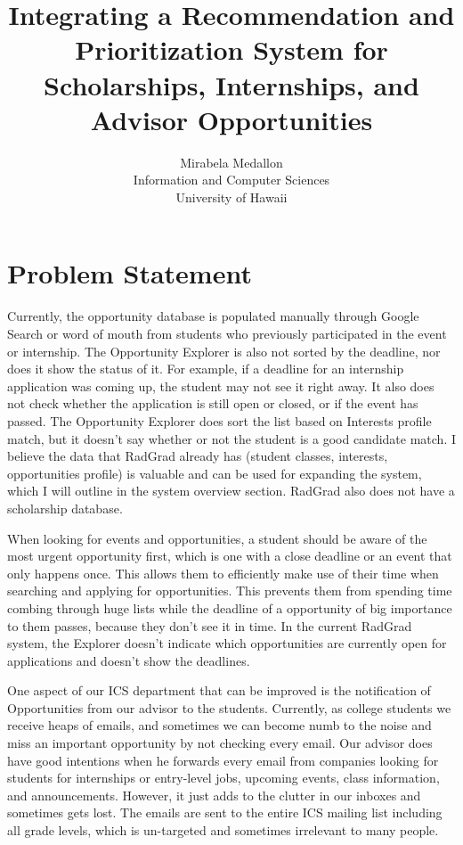 \documentclass[english]{proposalnsf}
\title{Integrating a Recommendation and Prioritization System for Scholarships, Internships, and Advisor Opportunities}
\author{Mirabela Medallon \\ Information and Computer Sciences \\ University of Hawaii}
\begin{document}
	\maketitle
	\tableofcontents
	\newpage
	
	\section{Problem Statement}
	\label{introduction}
	
	Currently, the opportunity database is populated manually through Google Search or word of mouth from students who previously participated in the event or internship. The Opportunity Explorer is also not sorted by the deadline, nor does it show the status of it. For example, if a deadline for an internship application was coming up, the student may not see it right away. It also does not check whether the application is still open or closed, or if the event has passed. The Opportunity Explorer does sort the list based on Interests profile match, but it doesn’t say whether or not the student is a good candidate match. I believe the data that RadGrad already has (student classes, interests, opportunities profile) is valuable and can be used for expanding the system, which I will outline in the system overview section. RadGrad also does not have a scholarship database.
	
	When looking for events and opportunities, a student should be aware of the most urgent opportunity first, which is one with a close deadline or an event that only happens once. This allows them to efficiently make use of their time when searching and applying for opportunities. This prevents them from spending time combing through huge lists while the deadline of a opportunity of big importance to them passes, because they don’t see it in time.
	In the current RadGrad system, the Explorer doesn’t indicate which opportunities are currently open for applications and doesn’t show the deadlines.
	
	
	One aspect of our ICS department that can be improved is the notification of Opportunities from our advisor to the students. Currently, as college students we receive heaps of emails, and sometimes we can become numb to the noise and miss an important opportunity by not checking every email. Our advisor does have good intentions when he forwards every email from companies looking for students for internships or entry-level jobs, upcoming events, class information, and announcements. However, it just adds to the clutter in our inboxes and sometimes gets lost. The emails are sent to the entire ICS mailing list including all grade levels, which is un-targeted and sometimes irrelevant to many people.
	
\end{document}
